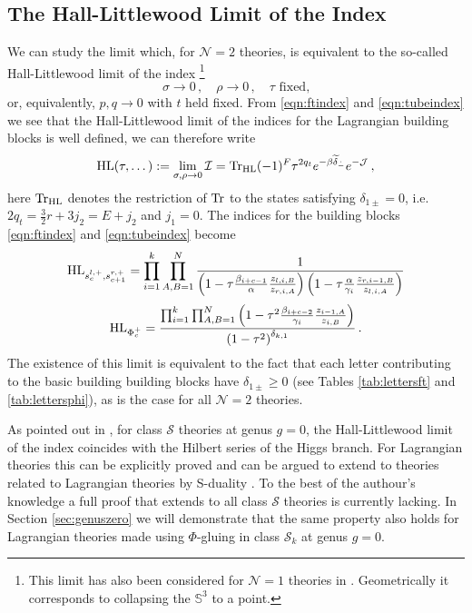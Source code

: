 \documentclass[main.tex]{subfiles}
\begin{document}
\subsection{The Hall-Littlewood Limit of the Index}
We can study the limit which, for $\mathcal{N}=2$ theories, is equivalent to the so-called Hall-Littlewood limit of the index \cite{Gadde:2011uv} \footnote{This limit has also been considered for $\mathcal{N}=1$ theories in \cite{Spiridonov:2009za,Rastelli:2016tbz}. Geometrically it corresponds to collapsing the $\mathbb{S}^3$ to a point.}
\begin{equation}
\sigma\to0\,,\quad \rho\to0\,,\quad \tau\,\,\text{fixed,}
\end{equation} 
or, equivalently, $p,q\to0$ with $t$ held fixed.  From \eqref{eqn:ftindex} and \eqref{eqn:tubeindex} we see that the Hall-Littlewood limit of the indices for the Lagrangian building blocks is well defined, we can therefore write
\begin{equation}\label{eqn:HL}
\textrm{HL}(\tau,\dots):=\lim_{\sigma,\rho\to0}\mathcal{I}=\operatorname{Tr}_{\textrm{HL}}(-1)^F\tau^{2q_t}e^{-\beta\widetilde{\delta}_{\dot-}}e^{-\mathcal{J}}\,,
\end{equation}
here $\operatorname{Tr}_{\textrm{HL}}$ denotes the restriction of $\operatorname{Tr}$ to the states satisfying $\delta_{1\pm}=0$, i.e. 
$2q_t=\frac{3}{2}r+3j_2=E+j_2$ and $j_1=0$. The indices for the building blocks \eqref{eqn:ftindex} and \eqref{eqn:tubeindex} become
\begin{equation}
\textrm{HL}_{s_{c}^{l,+},s_{c+1}^{r,+}}=\prod_{i=1}^k\prod_{A,B=1}^N\frac{1}{\left(1-\tau\frac{\beta_{i+c-1}}{\alpha}\frac{z_{l,i,B}}{z_{r,i,A}}\right)\left(1-\tau\frac{\alpha}{\gamma_i}\frac{z_{r,i-1,B}}{z_{l,i,A}}\right)}\label{eqn:HLFT}
\end{equation}
\begin{equation}
\textrm{HL}_{\Phi_c^+}=\frac{\prod_{i=1}^k\prod_{A,B=1}^N\left(1-\tau^2\frac{\beta_{i+c-2}}{\gamma_i}\frac{z_{i-1,A}}{z_{i,B}}\right)}{\left(1-\tau^2\right)^{\delta_{k,1}}}\label{eqn:HLSglue}\,.
\end{equation}
The existence of this limit is equivalent to the fact that each letter contributing to the basic building building blocks have $\delta_{1\pm}\geq0$ (see Tables \ref{tab:lettersft} and \ref{tab:lettersphi}), as is the case for all $\mathcal{N}=2$ theories. 

As pointed out in \cite{Gadde:2011uv,Hanany:2012dm}, for class $\mathcal{S}$ theories at genus $g=0$, the Hall-Littlewood limit of the index coincides with the Hilbert series of the Higgs branch. For Lagrangian theories this can be explicitly proved and can be argued to extend to theories related to Lagrangian theories by S-duality \cite{Gaiotto:2012uq}. To the best of the authour's knowledge a full proof that extends to all class $\mathcal{S}$ theories is currently lacking. In Section \ref{sec:genuszero} we will demonstrate that the same property also holds for Lagrangian theories made using $\Phi$-gluing in class $\mathcal{S}_k$ at genus $g=0$. 
\end{document}

